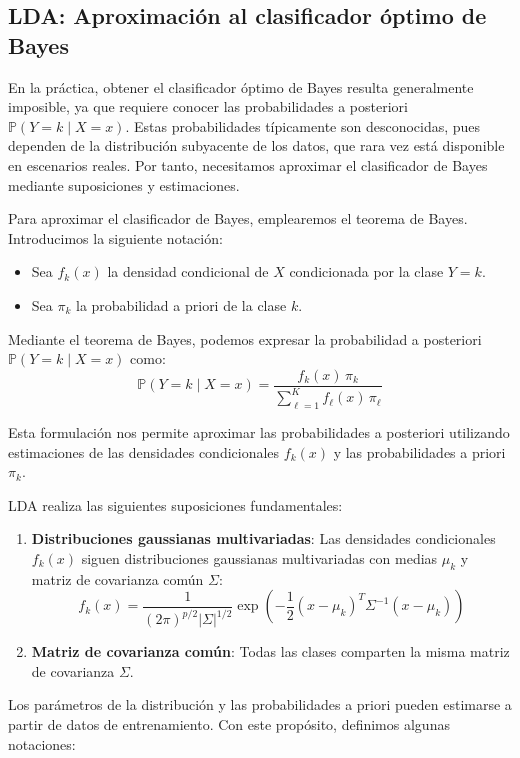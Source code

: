 \subsection{LDA: Aproximación al clasificador óptimo de Bayes}

En la práctica, obtener el clasificador óptimo de Bayes resulta generalmente imposible, ya que requiere conocer las probabilidades a posteriori $\mathbb{P}(Y = k \mid X = x)$. Estas probabilidades típicamente son desconocidas, pues dependen de la distribución subyacente de los datos, que rara vez está disponible en escenarios reales. Por tanto, necesitamos aproximar el clasificador de Bayes mediante suposiciones y estimaciones.

Para aproximar el clasificador de Bayes, emplearemos el teorema de Bayes. Introducimos la siguiente notación:
\begin{itemize}
    \item Sea $f_k(x)$ la densidad condicional de $X$ condicionada por la clase $Y = k$.
    \item Sea $\pi_k$ la probabilidad a priori de la clase $k$.
\end{itemize}

Mediante el teorema de Bayes, podemos expresar la probabilidad a posteriori $\mathbb{P}(Y = k \mid X = x)$ como:
\[
\mathbb{P}(Y = k \mid X = x) = \frac{f_k(x) \, \pi_k}{\sum_{\ell=1}^K f_\ell(x) \, \pi_\ell}
\]

Esta formulación nos permite aproximar las probabilidades a posteriori utilizando estimaciones de las densidades condicionales $f_k(x)$ y las probabilidades a priori $\pi_k$.

LDA realiza las siguientes suposiciones fundamentales:

\begin{enumerate}
    \item \textbf{Distribuciones gaussianas multivariadas}: Las densidades condicionales $f_k(x)$ siguen distribuciones gaussianas multivariadas con medias $\mu_k$ y matriz de covarianza común $\Sigma$:
    \[
    f_k(x) = \frac{1}{(2\pi)^{p/2} |\Sigma|^{1/2}} \exp\left(-\frac{1}{2}(x - \mu_k)^T \Sigma^{-1} (x - \mu_k)\right)
    \]
    \item \textbf{Matriz de covarianza común}: Todas las clases comparten la misma matriz de covarianza $\Sigma$.
\end{enumerate}

Los parámetros de la distribución y las probabilidades a priori pueden estimarse a partir de datos de entrenamiento. Con este propósito, definimos algunas notaciones:

